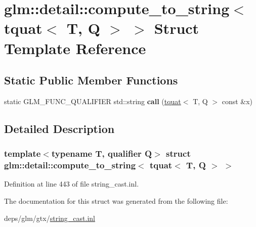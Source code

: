 \hypertarget{structglm_1_1detail_1_1compute__to__string_3_01tquat_3_01T_00_01Q_01_4_01_4}{}\section{glm\+:\+:detail\+:\+:compute\+\_\+to\+\_\+string$<$ tquat$<$ T, Q $>$ $>$ Struct Template Reference}
\label{structglm_1_1detail_1_1compute__to__string_3_01tquat_3_01T_00_01Q_01_4_01_4}
\subsection*{Static Public Member Functions}
\begin{DoxyCompactItemize}
\item 
\mbox{\label{structglm_1_1detail_1_1compute__to__string_3_01tquat_3_01T_00_01Q_01_4_01_4_a1ba65d187491ea559fde0e390800326a}} 
static G\+L\+M\+\_\+\+F\+U\+N\+C\+\_\+\+Q\+U\+A\+L\+I\+F\+I\+ER std\+::string {\bfseries call} (\hyperlink{structglm_1_1tquat}{tquat}$<$ T, Q $>$ const \&x)
\end{DoxyCompactItemize}


\subsection{Detailed Description}
\subsubsection*{template$<$typename T, qualifier Q$>$\newline
struct glm\+::detail\+::compute\+\_\+to\+\_\+string$<$ tquat$<$ T, Q $>$ $>$}



Definition at line 443 of file string\+\_\+cast.\+inl.



The documentation for this struct was generated from the following file\+:\begin{DoxyCompactItemize}
\item 
deps/glm/gtx/\hyperlink{string__cast_8inl}{string\+\_\+cast.\+inl}\end{DoxyCompactItemize}
